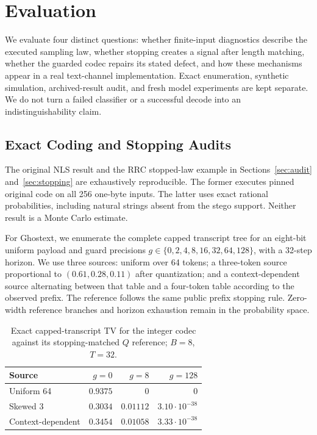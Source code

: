 \section{Evaluation}
\label{sec:evaluation}

We evaluate four distinct questions: whether finite-input diagnostics describe
the executed sampling law, whether stopping creates a signal after length
matching, whether the guarded codec repairs its stated defect, and how these
mechanisms appear in a real text-channel implementation. Exact enumeration,
synthetic simulation, archived-result audit, and fresh model experiments are
kept separate. We do not turn a failed classifier or a successful decode into
an indistinguishability claim.

\subsection{Exact Coding and Stopping Audits}

The original NLS result and the RRC stopped-law example in
Sections~\ref{sec:audit} and~\ref{sec:stopping} are exhaustively reproducible.
The former executes pinned original code on all 256 one-byte inputs. The latter
uses exact rational probabilities, including natural strings absent from the
stego support. Neither result is a Monte Carlo estimate.

For Ghostext, we enumerate the complete capped transcript tree for an eight-bit
uniform payload and guard precisions $g\in\{0,2,4,8,16,32,64,128\}$, with a
32-step horizon. We use three sources: uniform over 64 tokens; a three-token
source proportional to $(0.61,0.28,0.11)$ after quantization; and a
context-dependent source alternating between that table and a four-token table
according to the observed prefix. The reference follows the same public prefix
stopping rule. Zero-width reference branches and horizon exhaustion remain in
the probability space.

\begin{table}[t]
\centering
\caption{Exact capped-transcript TV for the integer codec against its
stopping-matched $Q$ reference; $B=8$, $T=32$.}
\label{tab:guard-tv}
\begin{tabular}{lrrr}
\toprule
Source & $g=0$ & $g=8$ & $g=128$ \\
\midrule
Uniform 64 & $0.9375$ & $0$ & $0$ \\
Skewed 3 & $0.3034$ & $0.01112$ & $3.10\cdot10^{-38}$ \\
Context-dependent & $0.3454$ & $0.01058$ & $3.33\cdot10^{-38}$ \\
\bottomrule
\end{tabular}
\end{table}

